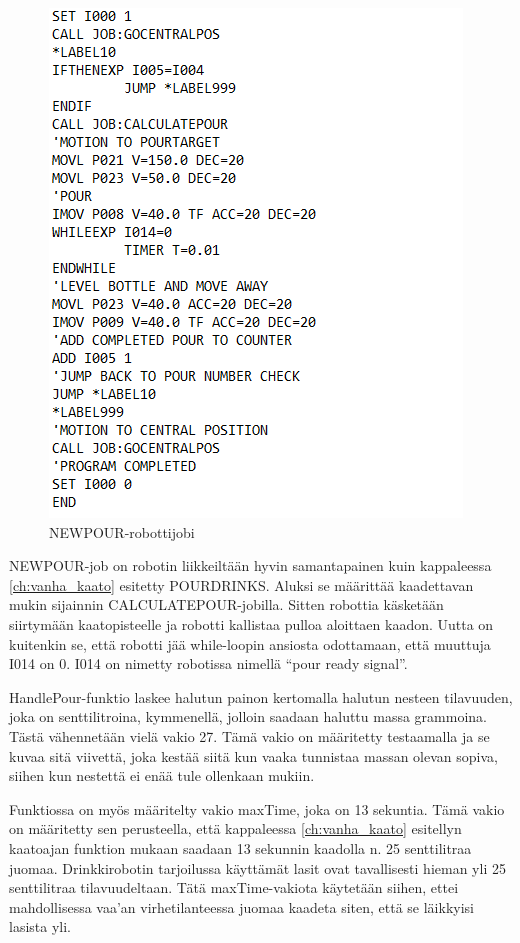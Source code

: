 \begin{figure}[h]
\begin{center}
\includegraphics[scale=0.8]{img/NEWPOUR.png}
\end{center}
\caption{NEWPOUR-robottijobi}
\label{fig:NEWPOUR}
\end{figure}

NEWPOUR-job on robotin liikkeiltään hyvin samantapainen kuin kappaleessa \ref{ch:vanha_kaato} esitetty POURDRINKS. Aluksi se määrittää kaadettavan mukin sijainnin CALCULATEPOUR-jobilla. Sitten robottia käsketään siirtymään kaatopisteelle ja robotti kallistaa pulloa aloittaen kaadon. Uutta on kuitenkin se, että robotti jää while-loopin ansiosta odottamaan, että muuttuja I014 on 0. I014 on nimetty robotissa nimellä ``pour ready signal''.

HandlePour-funktio laskee halutun painon kertomalla halutun nesteen tilavuuden, joka on senttilitroina, kymmenellä, jolloin saadaan haluttu massa grammoina. Tästä vähennetään vielä vakio 27. Tämä vakio on määritetty testaamalla ja se kuvaa sitä viivettä, joka kestää siitä kun vaaka tunnistaa massan olevan sopiva, siihen kun nestettä ei enää tule ollenkaan mukiin.

Funktiossa on myös määritelty vakio maxTime, joka on 13 sekuntia. Tämä vakio on määritetty sen perusteella, että kappaleessa \ref{ch:vanha_kaato} esitellyn kaatoajan funktion mukaan saadaan 13 sekunnin kaadolla n. 25 senttilitraa juomaa. Drinkkirobotin tarjoilussa käyttämät lasit ovat tavallisesti hieman yli 25 senttilitraa tilavuudeltaan. Tätä maxTime-vakiota käytetään siihen, ettei mahdollisessa vaa'an virhetilanteessa juomaa kaadeta siten, että se läikkyisi lasista yli.

